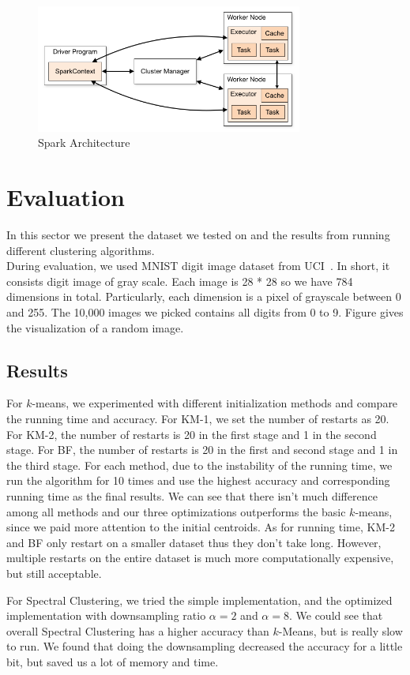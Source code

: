 \documentclass{acm_proc_article-sp}
\begin{document}
\begin{figure}[h]
\includegraphics[height=4.2cm]{spark_architecture.png}
\caption{Spark Architecture~\cite{sparkoverview}}
\label{spark_arch}
\end{figure}

\section{Evaluation}
In this sector we present the dataset we tested on and the results from running different clustering algorithms.\\
During evaluation, we used MNIST digit image dataset from UCI~\cite{Lichman:2013}. In short, it consists digit image of gray scale. Each image is 28 * 28 so we have 784 dimensions in total. Particularly, each dimension is a pixel of grayscale between 0 and 255. The 10,000 images we picked contains all digits from 0 to 9. Figure gives the visualization of a random image.

\subsection{Results}
For $k$-means, we experimented with different initialization methods and compare the running time and accuracy. For KM-1, we set the number of restarts as 20. For KM-2, the number of restarts is 20 in the first stage and 1 in the second stage. For BF, the number of restarts is 20 in the first and second stage and 1 in the third stage. For each method, due to the instability of the running time, we run the algorithm for 10 times and use the highest accuracy and corresponding running time as the final results. We can see that there isn't much difference among all methods and our three optimizations outperforms the basic $k$-means, since we paid more attention to the initial centroids. As for running time, KM-2 and BF only restart on a smaller dataset thus they don't take long. However, multiple restarts on the entire dataset is much more computationally expensive, but still acceptable.

For Spectral Clustering, we tried the simple implementation, and the optimized implementation with downsampling ratio $\alpha=2$ and $\alpha=8$. We could see that overall Spectral Clustering has a higher accuracy than $k$-Means, but is really slow to run. We found that doing the downsampling decreased the accuracy for a little bit, but saved us a lot of memory and time.
\end{document}
